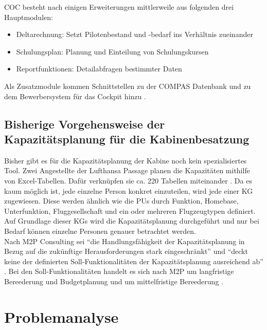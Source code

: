 \documentclass [12pt, a4paper, oneside, titlepage, ngerman]{article}
\begin{document}
\noindent \ac{COC} besteht nach einigen Erweiterungen mittlerweile aus folgenden drei Hauptmodulen:
\begin{itemize}
\item Deltarechnung: Setzt Pilotenbestand und -bedarf ins Verhältnis zueinander
\item Schulungsplan: Planung und Einteilung von Schulungskursen
\item Reportfunktionen: Detailabfragen bestimmter Daten
\end{itemize}

\noindent Als Zusatzmodule kommen Schnittstellen zu der COMPAS Datenbank und zu dem Bewerbersystem für das Cockpit hinzu \cite[vgl.][S.19]{compasdoku}.


\subsection{Bisherige Vorgehensweise der Kapazitätsplanung für die Kabinenbesatzung} \label{vorgehensweise}
Bisher gibt es für die Kapazitätsplanung der Kabine noch kein spezialisiertes Tool. Zwei Angestellte der Lufthansa Passage planen die Kapazitäten mithilfe von Excel-Tabellen. Dafür verknüpfen sie ca. 220 Tabellen miteinander \cite[vgl.][]{Gespraech2}. Da es kaum möglich ist, jede einzelne Person konkret einzuteilen, wird jede einer \ac{KG} zugewiesen. Diese werden ähnlich wie die \acp{PU} durch Funktion, Homebase, Unterfunktion, Fluggesellschaft und ein oder mehreren Flugzeugtypen definiert. Auf Grundlage dieser \acp{KG} wird die Kapazitätsplanung durchgeführt und nur bei Bedarf können einzelne Personen genauer betrachtet werden.  \\
Nach M2P Consulting sei "`die Handlungsfähigkeit der Kapazitätsplanung in Bezug auf die zukünftige Herausforderungen stark eingeschränkt"' \cite[S.5]{M2P} und "`deckt keine der definierten Soll-Funktionalitäten der Kapazitätsplanung ausreichend ab"' \cite[S.6]{M2P}. Bei den Soll-Funktionalitäten handelt es sich nach M2P um langfristige Bereederung und Budgetplanung und um mittelfristige Bereederung \cite[vgl.][S.6]{M2P}.

\newpage

\section{Problemanalyse} \label{unterschiede}
\end{document}
